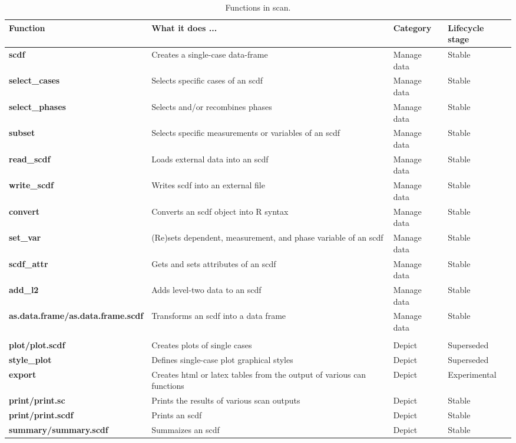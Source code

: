\documentclass[
]{book}
\begin{document}
\begin{table}

\caption{\label{tab:table-functions}Functions in scan.}
\begin{tabular}[t]{>{\raggedright\arraybackslash}p{15em}>{\raggedright\arraybackslash}p{30em}ll}
\toprule
Function & What it does ... & Category & Lifecycle stage\\
\midrule
\textbf{scdf} & Creates a single-case data-frame & Manage data & Stable\\
\textbf{select\_cases} & Selects specific cases of an scdf & Manage data & Stable\\
\textbf{select\_phases} & Selects and/or recombines phases & Manage data & Stable\\
\textbf{subset} & Selects specific measurements or variables of an scdf & Manage data & Stable\\
\textbf{read\_scdf} & Loads external data into an scdf & Manage data & Stable\\
\textbf{write\_scdf} & Writes scdf into an external file & Manage data & Stable\\
\textbf{convert} & Converts an scdf object into R syntax & Manage data & Stable\\
\textbf{set\_var} & (Re)sets dependent, measurement, and phase variable of an scdf & Manage data & Stable\\
\textbf{scdf\_attr} & Gets and sets attributes of an scdf & Manage data & Stable\\
\textbf{add\_l2} & Adds level-two data to an scdf & Manage data & Stable\\
\textbf{as.data.frame/as.data.frame.scdf} & Transforms an scdf into a data frame & Manage data & Stable\\
\textbf{} &  &  \vphantom{3} & \\
\textbf{plot/plot.scdf} & Creates plots of single cases & Depict & Superseded\\
\textbf{style\_plot} & Defines single-case plot graphical styles & Depict & Superseded\\
\textbf{export} & Creates html or latex tables from the output of various can functions & Depict & Experimental\\
\textbf{print/print.sc} & Prints the results of various scan outputs & Depict & Stable\\
\textbf{print/print.scdf} & Prints an scdf & Depict & Stable\\
\textbf{summary/summary.scdf} & Summaizes an scdf & Depict & Stable\\

\end{tabular}
\end{table}
\end{document}
